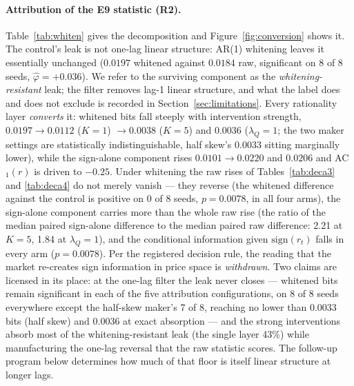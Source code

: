 \documentclass[11pt]{article}
\begin{document}
\paragraph{Attribution of the E9 statistic (R2).}
Table~\ref{tab:whiten} gives the decomposition and Figure~\ref{fig:conversion} shows it. The control's leak is
not one-lag linear structure: AR(1) whitening leaves it essentially unchanged
($0.0197$ whitened against $0.0184$ raw, significant on 8 of 8 seeds,
$\hat\varphi = +0.036$). We refer to the surviving component as the
\emph{whitening-resistant} leak; the filter removes lag-1 linear
structure, and what the label does and does not exclude is recorded in
Section~\ref{sec:limitations}. Every rationality layer \emph{converts} it:
whitened bits fall steeply with intervention strength,
$0.0197 \to 0.0112$ ($K{=}1$) $\to 0.0038$ ($K{=}5$) and $0.0036$
($\lambda_Q{=}1$; the two maker settings are statistically
indistinguishable, half skew's $0.0033$ sitting marginally lower), while
the sign-alone component rises
$0.0101 \to 0.0220$ and $0.0206$ and AC$_1(r)$ is driven to $-0.25$.
Under whitening the raw rises of Tables~\ref{tab:deca3} and
\ref{tab:deca4} do not merely vanish --- they reverse (the whitened
difference against the control is positive on 0 of 8 seeds,
$p = 0.0078$, in all four arms), the sign-alone component carries more
than the whole raw rise (the ratio of the median paired sign-alone
difference to the median paired raw difference: 2.21 at $K{=}5$, 1.84 at
$\lambda_Q{=}1$), and the conditional information given
$\mathrm{sign}(r_t)$ falls in every arm ($p = 0.0078$). Per the
registered decision rule, the reading that the market re-creates sign
information in price space is \emph{withdrawn}. Two claims are licensed
in its place: at the one-lag filter the leak never closes --- whitened
bits remain significant
in each of the five attribution configurations, on 8 of 8 seeds
everywhere except the half-skew
maker's 7 of 8, reaching no lower than $0.0033$
bits (half skew) and $0.0036$ at exact absorption --- and the strong
interventions absorb most of the
whitening-resistant leak (the single layer 43\%) while manufacturing the
one-lag reversal that the
raw statistic scores. The follow-up program below determines how much of
that floor is itself linear structure at longer lags.
\end{document}

